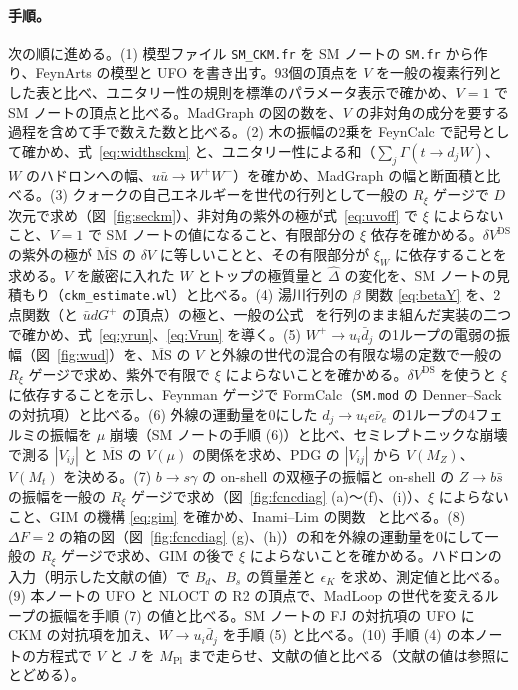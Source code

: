 \documentclass[a4paper,10pt]{ltjsarticle}
\newcommand{\MSbar}{\overline{\mathrm{MS}}}
\begin{document}
\paragraph{手順。}次の順に進める。(1) 模型ファイル \texttt{SM\_CKM.fr} を SM ノートの \texttt{SM.fr} から作り、FeynArts の模型と UFO を書き出す。93個の頂点を $V$ を一般の複素行列とした表と比べ、ユニタリー性の規則を標準のパラメータ表示で確かめ、$V=1$ で SM ノートの頂点と比べる。MadGraph の図の数を、$V$ の非対角の成分を要する過程を含めて手で数えた数と比べる。(2) 木の振幅の2乗を FeynCalc で記号として確かめ、式~\eqref{eq:widthsckm} と、ユニタリー性による和（$\sum_j\Gamma(t\to d_jW)$、$W$ のハドロンへの幅、$u\bar u\to W^+W^-$）を確かめ、MadGraph の幅と断面積と比べる。(3) クォークの自己エネルギーを世代の行列として一般の $R_\xi$ ゲージで $D$ 次元で求め（図~\ref{fig:seckm}）、非対角の紫外の極が式~\eqref{eq:uvoff} で $\xi$ によらないこと、$V=1$ で SM ノートの値になること、有限部分の $\xi$ 依存を確かめる。$\delta V^{\mathrm{DS}}$ の紫外の極が $\MSbar$ の $\delta V$ に等しいことと、その有限部分が $\xi_W$ に依存することを求める。$V$ を厳密に入れた $W$ とトップの極質量と $\hat\Delta$ の変化を、SM ノートの見積もり（\texttt{ckm\_estimate.wl}）と比べる。(4) 湯川行列の $\beta$ 関数 \eqref{eq:betaY} を、2点関数（と $\bar u dG^+$ の頂点）の極と、一般の公式~\cite{mv1,mv2,luo03} を行列のまま組んだ実装の二つで確かめ、式~\eqref{eq:yrun}、\eqref{eq:Vrun} を導く。(5) $W^+\to u_i\bar d_j$ の1ループの電弱の振幅（図~\ref{fig:wud}）を、$\MSbar$ の $V$ と外線の世代の混合の有限な場の定数で一般の $R_\xi$ ゲージで求め、紫外で有限で $\xi$ によらないことを確かめる。$\delta V^{\mathrm{DS}}$ を使うと $\xi$ に依存することを示し、Feynman ゲージで FormCalc（\texttt{SM.mod} の Denner--Sack の対抗項）と比べる。(6) 外線の運動量を0にした $d_j\to u_ie\bar\nu_e$ の1ループの4フェルミの振幅を $\mu$ 崩壊（SM ノートの手順 (6)）と比べ、セミレプトニックな崩壊で測る $|V_{ij}|$ と $\MSbar$ の $V(\mu)$ の関係を求め、PDG の $|V_{ij}|$ から $V(M_Z)$、$V(M_t)$ を決める。(7) $b\to s\gamma$ の on-shell の双極子の振幅と on-shell の $Z\to b\bar s$ の振幅を一般の $R_\xi$ ゲージで求め（図~\ref{fig:fcncdiag} (a)〜(f)、(i)）、$\xi$ によらないこと、GIM の機構 \eqref{eq:gim} を確かめ、Inami--Lim の関数~\cite{il81} と比べる。(8) $\Delta F=2$ の箱の図（図~\ref{fig:fcncdiag} (g)、(h)）の和を外線の運動量を0にして一般の $R_\xi$ ゲージで求め、GIM の後で $\xi$ によらないことを確かめる。ハドロンの入力（明示した文献の値）で $B_d$、$B_s$ の質量差と $\epsilon_K$ を求め、測定値と比べる。(9) 本ノートの UFO と NLOCT の R2 の頂点で、MadLoop の世代を変えるループの振幅を手順 (7) の値と比べる。SM ノートの FJ の対抗項の UFO に CKM の対抗項を加え、$W\to u_i\bar d_j$ を手順 (5) と比べる。(10) 手順 (4) の本ノートの方程式で $V$ と $J$ を $M_{\mathrm{Pl}}$ まで走らせ、文献の値と比べる（文献の値は参照にとどめる）。
\end{document}
